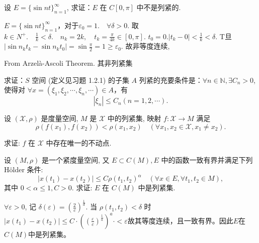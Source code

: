 \begin{exercise}
    设 $E=\{\sin nt\}_{n=1}^{\infty}$, 求证：$E$ 在 $C[0,\pi]$ 中不是列紧的.
\end{exercise}
\begin{solution}
    $E=\{\sin n t\}_{n=1}^{\infty}$，对于$\varepsilon_0=1.\quad \forall \delta>0$. 取 $k \in N^{+} . \quad \frac{1}{k}<\delta . \quad n_k=2 k, \quad t_k=\frac{\pi}{4 k} \in[0, \pi]$.
    $t_0=0 .\left|t_k-0\right|<\frac{1}{k}<\delta$. T旦 $\left|\sin n_k t_k-\sin n_k t_0\right|=\sin \frac{\pi}{2}=1 \geqslant \varepsilon_0$. 故非等度连续,
    
    From Arzelà-Ascoli Theorem. 其非列紧集
\end{solution}

\begin{exercise}
    求证：$S$ 空间 (定义见习题 1.2.1) 的子集 $A$ 列紧的充要条件是：$\forall n\in\mathbb{N},\exists C_n>0$, 使得对 $\forall x=(\xi_1,\xi_2,\cdots,\xi_n,\cdots)\in A$，有
    \begin{equation*}
        |\xi_n|\leqslant C_n(n=1,2,\cdots).
    \end{equation*}
\end{exercise}

\begin{exercise}
    设 $(\mathscr{X}, \rho)$ 是度量空间, $M$ 是 $\mathscr{X}$ 中的列紧集, 映射 $f: \mathscr{X} \rightarrow M$ 满足
    \begin{equation*}
        \rho\left(f\left(x_1\right), f\left(x_2\right)\right)<\rho\left(x_1, x_2\right) \quad\left(\forall x_1, x_2 \in \mathscr{X}, x_1 \neq x_2\right) .
    \end{equation*}

    求证: $f$ 在 $\mathscr{X}$ 中存在唯一的不动点.
\end{exercise}

\begin{exercise}
    设 $(M, \rho)$ 是一个紧度量空间, 又 $E \subset C(M), E$ 中的函数一致有界并满足下列 Hölder 条件:
    \begin{equation*}
        \left|x\left(t_1\right)-x\left(t_2\right)\right| \leqslant C \rho\left(t_1, t_2\right)^\alpha \quad\left(\forall x \in E, \forall t_1, t_2 \in M\right),
    \end{equation*}
    其中 $0<\alpha \leqslant 1, C>0$. 求证: $E$ 在 $C(M)$ 中是列紧集.
\end{exercise}
\begin{solution}
    $\forall \varepsilon>0$, 记 $\delta(\varepsilon)=\left(\frac{2}{c}\right)^{\frac{1}{d}}$. 当 $\rho\left(t_1, t_2\right)<\delta$ 时 $\left| x\left(t_1\right)-x\left(t_2\right) \right| \leq C \cdot\left(\left(\frac{\varepsilon}{c}\right)^{\frac{1}{a}}\right)^{a} \cdot < \varepsilon$故其等度连续，且一致有界。因此$E$在 $C(M)$中是列紧集。
\end{solution}




















